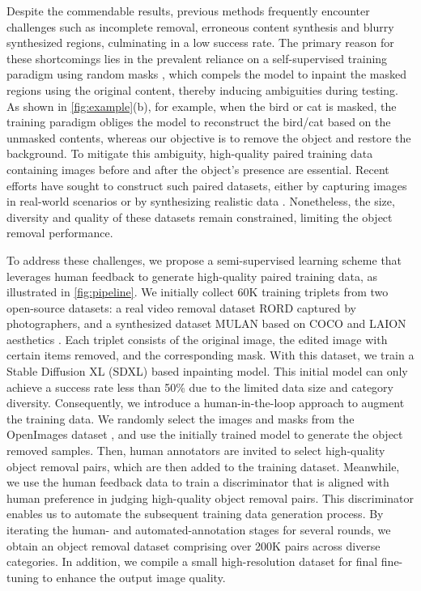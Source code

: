 \documentclass[10pt,twocolumn,letterpaper]{article}
\begin{document}
Despite the commendable results, previous methods frequently encounter challenges such as incomplete removal, erroneous content synthesis and blurry synthesized regions, culminating in a low success rate. The primary reason for these shortcomings lies in the prevalent reliance on a self-supervised training paradigm using random masks \cite{winter2024objectdrop,suvorov2022resolution,podell2023sdxl}, which compels the model to inpaint the masked regions using the original content, thereby inducing ambiguities during testing. As shown in \cref{fig:example}(b), for example, when the bird or cat is masked, the training paradigm obliges the model to reconstruct the bird/cat based on the unmasked contents, whereas our objective is to remove the object and restore the background. To mitigate this ambiguity, high-quality paired training data containing images before and after the object’s presence are essential. Recent efforts have sought to construct such paired datasets, either by capturing images  \cite{sagong2022rord,winter2024objectdrop} in real-world scenarios or by synthesizing realistic data \cite{yildirim2023inst,tudosiu2024mulan}. Nonetheless, the size, diversity and quality of these datasets remain constrained, limiting the object removal performance.

To address these challenges, we propose a semi-supervised learning scheme that leverages human feedback to generate high-quality paired training data, as illustrated in \cref{fig:pipeline}. We initially collect 60K training triplets from two open-source datasets: a real video removal dataset RORD  \cite{sagong2022rord} captured by photographers, and  a synthesized dataset MULAN  \cite{tudosiu2024mulan} based on COCO \cite{lin2014microsoft} and LAION aesthetics \cite{schuhmann2022laion}. Each triplet consists of the original image, the edited image with certain items removed, and the corresponding mask. With this dataset, we train a Stable Diffusion XL (SDXL) \cite{podell2023sdxl} based inpainting model. This initial model can only achieve a success rate less than 50\% due to the limited data size and category diversity. Consequently, we introduce a human-in-the-loop approach to augment the training data. We randomly select the images and masks from the OpenImages dataset \cite{kuznetsova2020open}, and  use the initially trained model to generate the object removed samples. Then, human annotators are invited to select high-quality object removal pairs, which are then added to the training dataset.
Meanwhile, we use the human feedback data to train a discriminator that is aligned with human preference in judging high-quality object removal pairs. This discriminator enables us to automate the subsequent training data generation process. By iterating the human- and automated-annotation stages for several rounds, we obtain an object removal dataset comprising over 200K pairs across diverse categories. In addition, we compile a small high-resolution dataset for final fine-tuning to enhance the output image quality.
\end{document}
